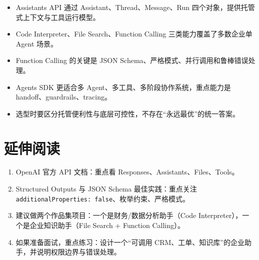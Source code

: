 \begin{itemize}[leftmargin=2em]
\item Assistants API 通过 Assistant、Thread、Message、Run 四个对象，提供托管式上下文与工具运行模型。
\item Code Interpreter、File Search、Function Calling 三类能力覆盖了多数企业单 Agent 场景。
\item Function Calling 的关键是 JSON Schema、严格模式、并行调用和鲁棒错误处理。
\item Agents SDK 更适合多 Agent、多工具、多阶段协作系统，重点能力是 handoff、guardrails、tracing。
\item 选型时要区分托管便利性与底层可控性，不存在``永远最优''的统一答案。
\end{itemize}

\section{延伸阅读}

\begin{enumerate}[leftmargin=2em]
\item OpenAI 官方 API 文档：重点看 Responses、Assistants、Files、Tools。
\item Structured Outputs 与 JSON Schema 最佳实践：重点关注 \texttt{additionalProperties: false}、枚举约束、严格模式。
\item 建议做两个作品集项目：一个是财务/数据分析助手（Code Interpreter），一个是企业知识助手（File Search + Function Calling）。
\item 如果准备面试，重点练习：设计一个``可调用 CRM、工单、知识库''的企业助手，并说明权限边界与错误处理。
\end{enumerate}
